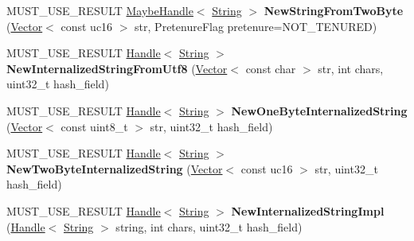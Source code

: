 \begin{DoxyCompactItemize}
\item 
\hypertarget{classv8_1_1internal_1_1_v8___f_i_n_a_l_ae93fe8aa84ecb2f7bcb09cc57c6aedd5}{}M\+U\+S\+T\+\_\+\+U\+S\+E\+\_\+\+R\+E\+S\+U\+L\+T \hyperlink{classv8_1_1internal_1_1_maybe_handle}{Maybe\+Handle}$<$ \hyperlink{classv8_1_1internal_1_1_string}{String} $>$ {\bfseries New\+String\+From\+Two\+Byte} (\hyperlink{classv8_1_1internal_1_1_vector}{Vector}$<$ const uc16 $>$ str, Pretenure\+Flag pretenure=N\+O\+T\+\_\+\+T\+E\+N\+U\+R\+E\+D)\label{classv8_1_1internal_1_1_v8___f_i_n_a_l_ae93fe8aa84ecb2f7bcb09cc57c6aedd5}

\item 
\hypertarget{classv8_1_1internal_1_1_v8___f_i_n_a_l_a14888a33a173beab819c5d15e8fc6793}{}M\+U\+S\+T\+\_\+\+U\+S\+E\+\_\+\+R\+E\+S\+U\+L\+T \hyperlink{classv8_1_1internal_1_1_handle}{Handle}$<$ \hyperlink{classv8_1_1internal_1_1_string}{String} $>$ {\bfseries New\+Internalized\+String\+From\+Utf8} (\hyperlink{classv8_1_1internal_1_1_vector}{Vector}$<$ const char $>$ str, int chars, uint32\+\_\+t hash\+\_\+field)\label{classv8_1_1internal_1_1_v8___f_i_n_a_l_a14888a33a173beab819c5d15e8fc6793}

\item 
\hypertarget{classv8_1_1internal_1_1_v8___f_i_n_a_l_aead5223376c63085d41a0754e1248352}{}M\+U\+S\+T\+\_\+\+U\+S\+E\+\_\+\+R\+E\+S\+U\+L\+T \hyperlink{classv8_1_1internal_1_1_handle}{Handle}$<$ \hyperlink{classv8_1_1internal_1_1_string}{String} $>$ {\bfseries New\+One\+Byte\+Internalized\+String} (\hyperlink{classv8_1_1internal_1_1_vector}{Vector}$<$ const uint8\+\_\+t $>$ str, uint32\+\_\+t hash\+\_\+field)\label{classv8_1_1internal_1_1_v8___f_i_n_a_l_aead5223376c63085d41a0754e1248352}

\item 
\hypertarget{classv8_1_1internal_1_1_v8___f_i_n_a_l_ad38d2a386ab4996c1561d3ccc73bb601}{}M\+U\+S\+T\+\_\+\+U\+S\+E\+\_\+\+R\+E\+S\+U\+L\+T \hyperlink{classv8_1_1internal_1_1_handle}{Handle}$<$ \hyperlink{classv8_1_1internal_1_1_string}{String} $>$ {\bfseries New\+Two\+Byte\+Internalized\+String} (\hyperlink{classv8_1_1internal_1_1_vector}{Vector}$<$ const uc16 $>$ str, uint32\+\_\+t hash\+\_\+field)\label{classv8_1_1internal_1_1_v8___f_i_n_a_l_ad38d2a386ab4996c1561d3ccc73bb601}

\item 
\hypertarget{classv8_1_1internal_1_1_v8___f_i_n_a_l_ae79c8c9ed4493d4b58c4d6bc917db9c9}{}M\+U\+S\+T\+\_\+\+U\+S\+E\+\_\+\+R\+E\+S\+U\+L\+T \hyperlink{classv8_1_1internal_1_1_handle}{Handle}$<$ \hyperlink{classv8_1_1internal_1_1_string}{String} $>$ {\bfseries New\+Internalized\+String\+Impl} (\hyperlink{classv8_1_1internal_1_1_handle}{Handle}$<$ \hyperlink{classv8_1_1internal_1_1_string}{String} $>$ string, int chars, uint32\+\_\+t hash\+\_\+field)\label{classv8_1_1internal_1_1_v8___f_i_n_a_l_ae79c8c9ed4493d4b58c4d6bc917db9c9}


\end{DoxyCompactItemize}
